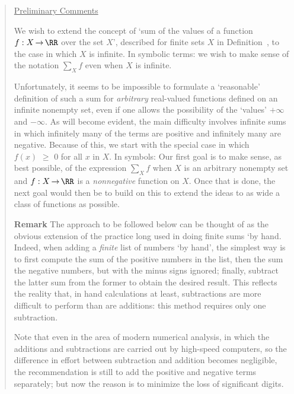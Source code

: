 \V

\begin{quotation}
{\footnotesize \underline{Preliminary Comments}

        We wish to extend the concept of `sum of the values of a function $f:X \,{\rightarrow}\, {\RR}$ over the set $X$',
    described for finite sets $X$ in Definition~, to the case in which $X$ is infinite.
    In symbolic terms: we wish to make sense of the notation ${\sum}_{X} f$ even when $X$ is infinite.

    Unfortunately, it seems to be impossible to formulate a `reasonable' definition of such a sum for {\em arbitrary}
    real-valued functions defined on an infinite nonempty set, even if one allows the possibility of the `values' $+{\infty}$ and $-{\infty}$.
    As will become evident, the main difficulty involves infinite sums in which infinitely many of the terms are positive and infinitely many are negative.
        Because of this, we start with the special case in which $f(x)\,\,{\geq}\,\,0$ for all $x$ in $X$.
    In symbols: Our first goal is to make sense, as best possible, of the expression ${\sum}_{X} f$ when $X$ is an arbitrary nonempty set
    and $f:X \,{\rightarrow}\, {\RR}$ is a {\em nonnegative} function on $X$.
    Once that is done, the next goal would then be to build on this to extend the ideas to as wide a class of functions as possible.

\V

        {\bf Remark} The approach to be followed below can be thought of as the obvious extension of the practice long used in doing finite sums `by hand.
    Indeed, when adding a {\em finite} list of numbers `by hand', the simplest way is to first compute the sum of the positive numbers in the list,
    then the sum the negative numbers, but with the minus signs ignored; finally, subtract the latter sum from the former to obtain the desired result.
    This reflects the reality that, in hand calculations at least, subtractions are more difficult to perform than are additions:
    this method requires only one subtraction.

        Note that even in the area of modern numerical analysis, in which the additions and subtractions are carried out by high-speed computers,
    so the difference in effort between subtraction and addition becomes negligible,
    the recommendation is still to add the positive and negative terms separately; but now the reason is to minimize the loss of significant digits.

}
\end{quotation}
